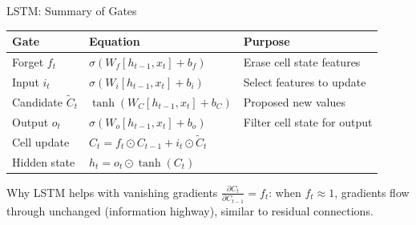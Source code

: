 \begin{frame}{LSTM: Summary of Gates}
  \begin{center}
  \renewcommand{\arraystretch}{1.4}
  \begin{tabular}{llp{5.5cm}}
    \toprule
    \textbf{Gate} & \textbf{Equation} & \textbf{Purpose} \\
    \midrule
    Forget $f_t$ & $\sigma(W_f [h_{t-1}, x_t] + b_f)$ & Erase cell state features \\
    Input $i_t$ & $\sigma(W_i [h_{t-1}, x_t] + b_i)$ & Select features to update \\
    Candidate $\tilde{C}_t$ & $\tanh(W_C [h_{t-1}, x_t] + b_C)$ & Proposed new values \\
    Output $o_t$ & $\sigma(W_o [h_{t-1}, x_t] + b_o)$ & Filter cell state for output \\
    \midrule
    Cell update & $C_t = f_t \odot C_{t-1} + i_t \odot \tilde{C}_t$ & \\
    Hidden state & $h_t = o_t \odot \tanh(C_t)$ & \\
    \bottomrule
  \end{tabular}
  \end{center}

  \vspace{0.5em}
  \begin{block}{Why LSTM helps with vanishing gradients}
    $\frac{\partial C_t}{\partial C_{t-1}} = f_t$: when $f_t \approx 1$, gradients flow through unchanged (information highway), similar to residual connections.
  \end{block}
\end{frame}



